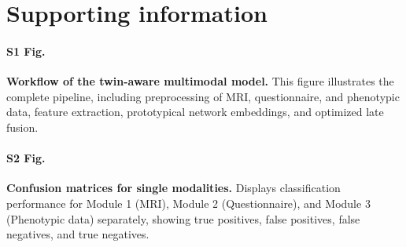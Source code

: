 \documentclass[10pt,letterpaper]{article}
\begin{document}
\section*{Supporting information}

\paragraph*{S1 Fig.}
\label{S1_Fig}
\textbf{Workflow of the twin-aware multimodal model.} This figure illustrates the complete pipeline, including preprocessing of MRI, questionnaire, and phenotypic data, feature extraction, prototypical network embeddings, and optimized late fusion.

\paragraph*{S2 Fig.}
\label{S2_Fig}
\textbf{Confusion matrices for single modalities.} Displays classification performance for Module 1 (MRI), Module 2 (Questionnaire), and Module 3 (Phenotypic data) separately, showing true positives, false positives, false negatives, and true negatives.



%
%


\end{document}
